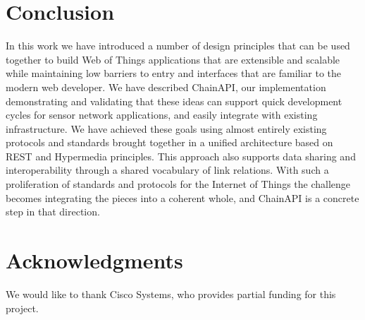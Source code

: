 \documentclass{acm_proc_article-sp}
\begin{document}
\section{Conclusion}
In this work we have introduced a number of design principles that can be used
together to build Web of Things applications that are extensible and scalable
while maintaining low barriers to entry and interfaces that are familiar to the
modern web developer. We have described ChainAPI, our implementation
demonstrating and validating that these ideas can support quick development
cycles for sensor network applications, and easily integrate with existing
infrastructure. We have achieved these goals using almost entirely existing
protocols and standards brought together in a unified architecture based on
REST and Hypermedia principles. This approach also supports data sharing and
interoperability through a shared vocabulary of link relations. With such a
proliferation of standards and protocols for the Internet of Things the
challenge becomes integrating the pieces into a coherent whole, and ChainAPI
is a concrete step in that direction.

\section{Acknowledgments}
We would like to thank Cisco Systems, who provides partial funding for this
project.


%
%
\end{document}
